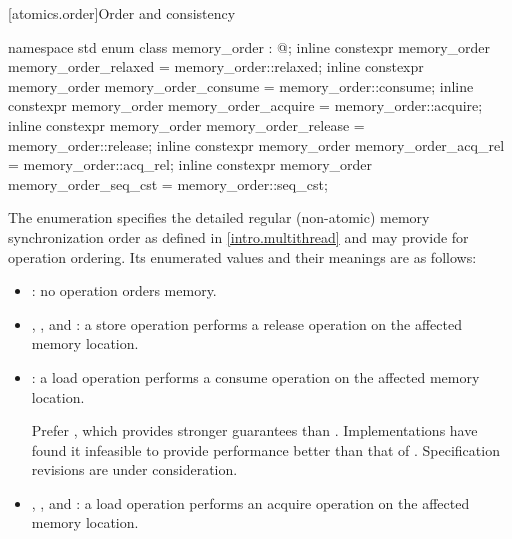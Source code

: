 [atomics.order]{Order and consistency}
%
%
%
%
%
%
%
%
%
%
%
%
%

\begin{codeblock}
namespace std {
  enum class memory_order : @;
  inline constexpr memory_order memory_order_relaxed = memory_order::relaxed;
  inline constexpr memory_order memory_order_consume = memory_order::consume;
  inline constexpr memory_order memory_order_acquire = memory_order::acquire;
  inline constexpr memory_order memory_order_release = memory_order::release;
  inline constexpr memory_order memory_order_acq_rel = memory_order::acq_rel;
  inline constexpr memory_order memory_order_seq_cst = memory_order::seq_cst;
}
\end{codeblock}

\pnum
The enumeration  specifies the detailed regular
(non-atomic) memory synchronization order as defined in
\ref{intro.multithread} and may provide for operation ordering. Its
enumerated values and their meanings are as follows:

\begin{itemize}
\item {}: no operation orders memory.

\item {}, , and
: a store operation performs a release operation on the
affected memory location.

\item {}: a load operation performs a consume operation on the
affected memory location.
\begin{note} Prefer , which provides stronger guarantees
than . Implementations have found it infeasible
to provide performance better than that of .
Specification revisions are under consideration. \end{note}

\item {}, , and
: a load operation performs an acquire operation on the
affected memory location.
\end{itemize}

